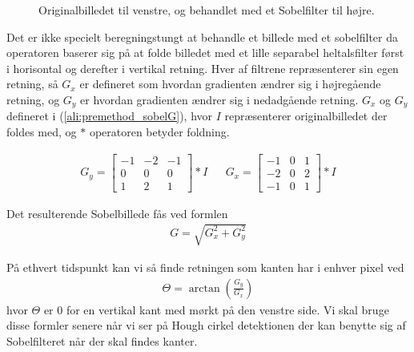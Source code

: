 \begin{figure}[H]
\begin{minipage}[b]{0.5\linewidth}
	\end{minipage}
	\caption{Originalbilledet til venstre\cite{sobel1}, og behandlet med et Sobelfilter til højre\cite{sobel2}.\label{fig:premethod_sobelres}}
\end{figure}

Det er ikke specielt beregningstungt at behandle et billede med et sobelfilter da operatoren baserer sig på at folde billedet med et lille separabel heltalsfilter først i horisontal og derefter i vertikal retning\cite{sobel}. Hver af filtrene repræsenterer sin egen retning, så $G_x$ er defineret som hvordan gradienten ændrer sig i højregående retning, og $G_y$ er hvordan gradienten ændrer sig i nedadgående retning. $G_x$ og $G_y$ defineret i  (\ref{ali:premethod_sobelG}), hvor $I$ repræsenterer originalbilledet der foldes med, og $*$ operatoren betyder foldning.

\begin{align}
	G_y = \begin{bmatrix}
		-1 & -2 & -1\\
		0 & 0 & 0\\
		1 & 2 & 1
	\end{bmatrix} * I
	&&
	G_x = \begin{bmatrix}
		-1 & 0 & 1\\
		-2 & 0 & 2\\
		-1 & 0 & 1
	\end{bmatrix} * I
	\label{ali:premethod_sobelG}
\end{align} 

Det resulterende Sobelbillede fås ved formlen 
\begin{align}
	G = \sqrt{G_x^2 + G_y^2}
\end{align}

På ethvert tidspunkt kan vi så finde retningen som kanten har i enhver pixel ved 
\begin{align}
	\Theta = \arctan\left(\frac{G_y}{G_x}\right)
	\label{ali:premethod_sobelTheta}
\end{align}
hvor $\Theta$ er 0 for en vertikal kant med mørkt på den venstre side. Vi skal bruge disse formler senere når vi ser på Hough cirkel detektionen der kan benytte sig af Sobelfilteret når der skal findes kanter. 


